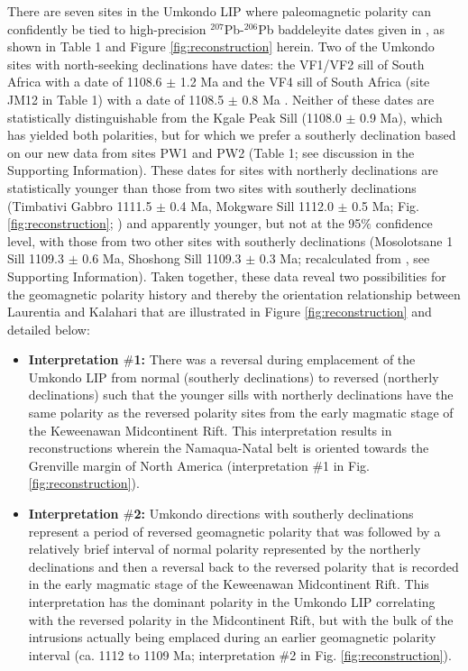 \documentclass[11pt,letterpaper]{article}
\begin{document}
There are seven sites in the Umkondo LIP where paleomagnetic polarity can confidently be tied to high-precision $^{207}$Pb-$^{206}$Pb baddeleyite dates given in \citep{Hanson2004a}, as shown in Table 1 and Figure \ref{fig:reconstruction} herein. Two of the Umkondo sites with north-seeking declinations have dates: the VF1/VF2 sill of South Africa with a date of 1108.6 $\pm$ 1.2 Ma and the VF4 sill of South Africa (site JM12 in Table 1) with a date of 1108.5 $\pm$ 0.8 Ma \citep{Hanson2004a}. Neither of these dates are statistically distinguishable from the Kgale Peak Sill (1108.0 $\pm$ 0.9 Ma), which has yielded both polarities, but for which we prefer a southerly declination based on our new data from sites PW1 and PW2 (Table 1; see discussion in the Supporting Information). These dates for sites with northerly declinations are statistically younger than those from two sites with southerly declinations (Timbativi Gabbro 1111.5 $\pm$ 0.4 Ma, Mokgware Sill 1112.0 $\pm$ 0.5 Ma; Fig. \ref{fig:reconstruction}; \citealt{Hanson2004a}) and apparently younger, but not at the 95$\%$ confidence level, with those from two other sites with southerly declinations (Mosolotsane 1 Sill 1109.3 $\pm$ 0.6 Ma, Shoshong Sill 1109.3 $\pm$ 0.3 Ma; recalculated from \citealt{Hanson2004a}, see Supporting Information). Taken together, these data reveal two possibilities for the geomagnetic polarity history and thereby the orientation relationship between Laurentia and Kalahari that are illustrated in Figure \ref{fig:reconstruction} and detailed below:
\begin{itemize}
\item \textbf{Interpretation $\#$1:} There was a reversal during emplacement of the Umkondo LIP from normal (southerly declinations) to reversed (northerly declinations) such that the younger sills with northerly declinations have the same polarity as the reversed polarity sites from the early magmatic stage of the Keweenawan Midcontinent Rift. This interpretation results in reconstructions wherein the Namaqua-Natal belt is oriented towards the Grenville margin of North America (interpretation $\#$1 in Fig.  \ref{fig:reconstruction}).
\item \textbf{Interpretation $\#$2:} Umkondo directions with southerly declinations represent a period of reversed geomagnetic polarity that was followed by a relatively brief interval of normal polarity represented by the northerly declinations and then a reversal back to the reversed polarity that is recorded in the early magmatic stage of the Keweenawan Midcontinent Rift. This interpretation has the dominant polarity in the Umkondo LIP correlating with the reversed polarity in the Midcontinent Rift, but with the bulk of the intrusions actually being emplaced during an earlier geomagnetic polarity interval (ca. 1112 to 1109 Ma; interpretation $\#$2 in Fig.  \ref{fig:reconstruction}). 
\end{itemize}
\end{document}
